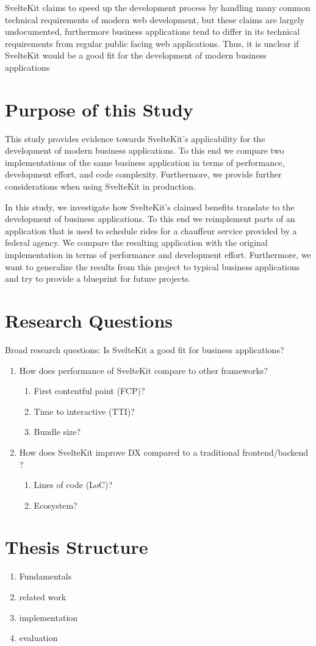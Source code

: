 SvelteKit claims to speed up the development process by handling many common technical requirements of modern web development, but these claims are largely undocumented, furthermore business applications tend to differ in its technical requirements from regular public facing web applications. Thus, it is unclear if SvelteKit would be a good fit for the development of modern business applications

\section{Purpose of this Study}
\label{sec:purpose-of-this-study}
This study provides evidence towards SvelteKit's applicability for the development of modern business applications. To this end we compare two implementations of the same business application in terms of performance, development effort, and code complexity. Furthermore, we provide further considerations when using SvelteKit in production.

In this study, we investigate how SvelteKit's claimed benefits translate to the development of business applications. To this end we reimplement parts of an application that is used to schedule rides for a chauffeur service provided by a federal agency. We compare the resulting application with the original implementation in terms of performance and development effort. Furthermore, we want to generalize the results from this project to typical business applications and try to provide a blueprint for future projects.

\section{Research Questions}

Broad research questions: Is SvelteKit a good fit for business applications?
\begin{enumerate}
    \item How does performance of SvelteKit compare to other frameworks?
          \begin{enumerate}
              \item First contentful paint (FCP)?
              \item Time to interactive (TTI)?
              \item Bundle size?
          \end{enumerate}
    \item How does SvelteKit improve DX compared to a traditional frontend/backend ?
          \begin{enumerate}
              \item Lines of code (LoC)?
              \item Ecosystem?
          \end{enumerate}
\end{enumerate}


\section{Thesis Structure}

\begin{enumerate}
    \item Fundamentals
    \item related work
    \item implementation
    \item evaluation
\end{enumerate}
